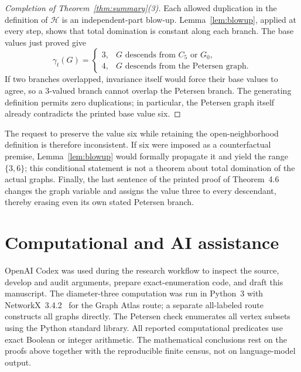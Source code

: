\documentclass[11pt]{article}
\theoremstyle{remark}
\begin{document}
\begin{proof}[Completion of Theorem~\ref{thm:summary}(3)]
Each allowed duplication in the definition of \(\mathcal H\) is an
independent-part blow-up.  Lemma~\ref{lem:blowup}, applied at every step, shows
that total domination is constant along each branch.  The base values just
proved give
\[
\gamma_t(G)=
\begin{cases}
3,&G\text{ descends from }C_5\text{ or }G_0,\\
4,&G\text{ descends from the Petersen graph}.
\end{cases}
\]
If two branches overlapped, invariance itself would force their base values to
agree, so a 3-valued branch cannot overlap the Petersen branch.  The generating
definition permits zero duplications; in particular, the Petersen graph itself
already contradicts the printed base value six.
\end{proof}

The request to preserve the value six while retaining the open-neighborhood
definition is therefore inconsistent.  If six were imposed as a counterfactual
premise, Lemma~\ref{lem:blowup} would formally propagate it and yield the range
\(\{3,6\}\); this conditional statement is not a theorem about total domination
of the actual graphs.  Finally, the last sentence of the printed proof of
Theorem~4.6 changes the graph variable and assigns the value three to every
descendant, thereby erasing even its own stated Petersen branch.

\section*{Computational and AI assistance}

OpenAI Codex was used during the research workflow to inspect the source,
develop and audit arguments, prepare exact-enumeration code, and draft this
manuscript.  The diameter-three computation was run in Python~3 with
NetworkX~3.4.2~\cite{HagbergSchultSwart2008} for the Graph Atlas route; a separate all-labeled route constructs
all graphs directly.  The Petersen check enumerates all vertex subsets using
the Python standard library.  All reported computational predicates use exact
Boolean or integer arithmetic.  The mathematical conclusions rest on the
proofs above together with the reproducible finite census, not on language-model
output.



\end{document}
